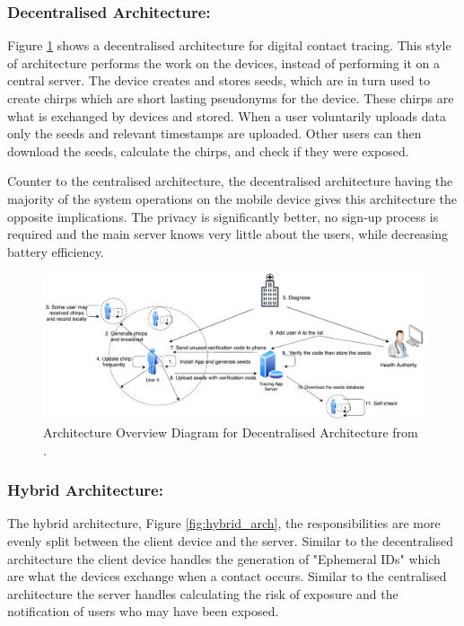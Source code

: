 \documentclass{l4proj}
\begin{document}
\subsubsection{Decentralised Architecture:}

Figure \ref{fig:decentralised_arch} shows a decentralised architecture for digital contact tracing. This style of architecture performs the work on the devices, instead of performing it on a central server. The device creates and stores seeds, which are in turn used to create chirps which are short lasting pseudonyms for the device. These chirps are what is exchanged by devices and stored. When a user voluntarily uploads data only the seeds and relevant timestamps are uploaded. Other users can then download the seeds, calculate the chirps, and check if they were exposed.

Counter to the centralised architecture, the decentralised architecture having the majority of the system operations on the mobile device gives this architecture the opposite implications. The privacy is significantly better, no sign-up process is required and the main server knows very little about the users, while decreasing battery efficiency.

\begin{figure}[!htb]
    \centering
    \includegraphics[width=0.8\linewidth]{images/ahmed_decentralised.png}

    \caption{ Architecture Overview Diagram for Decentralised Architecture from \citet{ahmed_survey_2020}.
    }

    \label{fig:decentralised_arch}
\end{figure}

\subsubsection{Hybrid Architecture:}

The hybrid architecture, Figure \ref{fig:hybrid_arch}, the responsibilities are more evenly split between the client device and the server. Similar to the decentralised architecture the client device handles the generation of "Ephemeral IDs" which are what the devices exchange when a contact occurs. Similar to the centralised architecture the server handles calculating the risk of exposure and the notification of users who may have been exposed.
\end{document}
